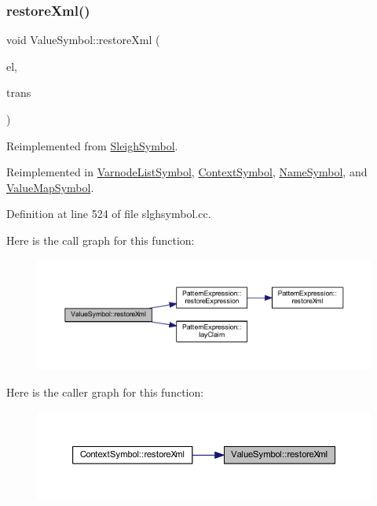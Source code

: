 \subsubsection{\texorpdfstring{restoreXml()}{restoreXml()}}
{\footnotesize\ttfamily void Value\+Symbol\+::restore\+Xml (\begin{DoxyParamCaption}\item[{const \mbox{\hyperlink{class_element}{Element}} $\ast$}]{el,  }\item[{\mbox{\hyperlink{class_sleigh_base}{Sleigh\+Base}} $\ast$}]{trans }\end{DoxyParamCaption})\hspace{0.3cm}{\ttfamily [virtual]}}



Reimplemented from \mbox{\hyperlink{class_sleigh_symbol_accaec1696f99366fb0e089a7fceb56a3}{Sleigh\+Symbol}}.



Reimplemented in \mbox{\hyperlink{class_varnode_list_symbol_a61923762838951414bd2c84454652d44}{Varnode\+List\+Symbol}}, \mbox{\hyperlink{class_context_symbol_a3ea7d156033d1dc82c9c3452496641a9}{Context\+Symbol}}, \mbox{\hyperlink{class_name_symbol_a3ff5b56a8a5cfd2e009cc5c9e8a49e97}{Name\+Symbol}}, and \mbox{\hyperlink{class_value_map_symbol_a713f4ece8b103374e08d4b53f9ef174b}{Value\+Map\+Symbol}}.



Definition at line 524 of file slghsymbol.\+cc.

Here is the call graph for this function\+:
\nopagebreak
\begin{figure}[H]
\begin{center}
\leavevmode
\includegraphics[width=350pt]{class_value_symbol_af9104983ea7381b608fe56b5ab8a2d7c_cgraph}
\end{center}
\end{figure}
Here is the caller graph for this function\+:
\nopagebreak
\begin{figure}[H]
\begin{center}
\leavevmode
\includegraphics[width=350pt]{class_value_symbol_af9104983ea7381b608fe56b5ab8a2d7c_icgraph}
\end{center}
\end{figure}
\mbox{\label{class_value_symbol_aa7b4012d522c5864aea52486b0d47978}} 
